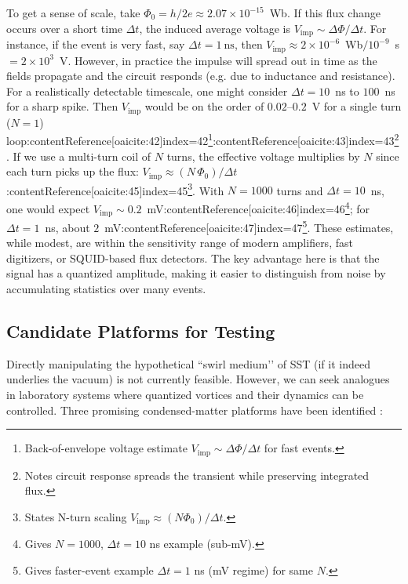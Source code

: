 \documentclass[12pt]{article}
\begin{document}
        To get a sense of scale, take $\Phi_{0}=h/2e\approx2.07\times10^{-15}$~Wb. If this flux change occurs over a short time $\Delta t$, the induced average voltage is $V_{\text{imp}} \sim \Delta \Phi/\Delta t$. For instance, if the event is very fast, say $\Delta t = 1~\text{ns}$, then $V_{\text{imp}}\approx 2\times10^{-6}$~Wb$/10^{-9}$~s $= 2\times10^{3}$~V. However, in practice the impulse will spread out in time as the fields propagate and the circuit responds (e.g. due to inductance and resistance). For a realistically detectable timescale, one might consider $\Delta t = 10$~ns to $100$~ns for a sharp spike. Then $V_{\text{imp}}$ would be on the order of $0.02$--$0.2$~V for a single turn ($N=1$) loop:contentReference[oaicite:42]{index=42}\footnote{Back-of-envelope voltage estimate $V_{\text{imp}}\sim\Delta\Phi/\Delta t$ for fast events.}:contentReference[oaicite:43]{index=43}\footnote{Notes circuit response spreads the transient while preserving integrated flux.}. If we use a multi-turn coil of $N$ turns, the effective voltage multiplies by $N$ since each turn picks up the flux: $V_{\text{imp}} \approx (N\,\Phi_{0})/\Delta t$:contentReference[oaicite:45]{index=45}\footnote{States N-turn scaling $V_{\text{imp}}\approx (N\Phi_0)/\Delta t$.}. With $N=1000$ turns and $\Delta t=10$~ns, one would expect $V_{\text{imp}}\sim 0.2$~mV:contentReference[oaicite:46]{index=46}\footnote{Gives $N=1000$, $\Delta t=10$ ns example (sub-mV).}; for $\Delta t=1$~ns, about $2$~mV:contentReference[oaicite:47]{index=47}\footnote{Gives faster-event example $\Delta t=1$ ns (mV regime) for same $N$.}. These estimates, while modest, are within the sensitivity range of modern amplifiers, fast digitizers, or SQUID-based flux detectors. The key advantage here is that the signal has a quantized amplitude, making it easier to distinguish from noise by accumulating statistics over many events.

    \subsection{Candidate Platforms for Testing}
        Directly manipulating the hypothetical ``swirl medium’’ of SST (if it indeed underlies the vacuum) is not currently feasible. However, we can seek analogues in laboratory systems where quantized vortices and their dynamics can be controlled. Three promising condensed-matter platforms have been identified \cite{Iskandarani2025FluxComp}:
\end{document}
